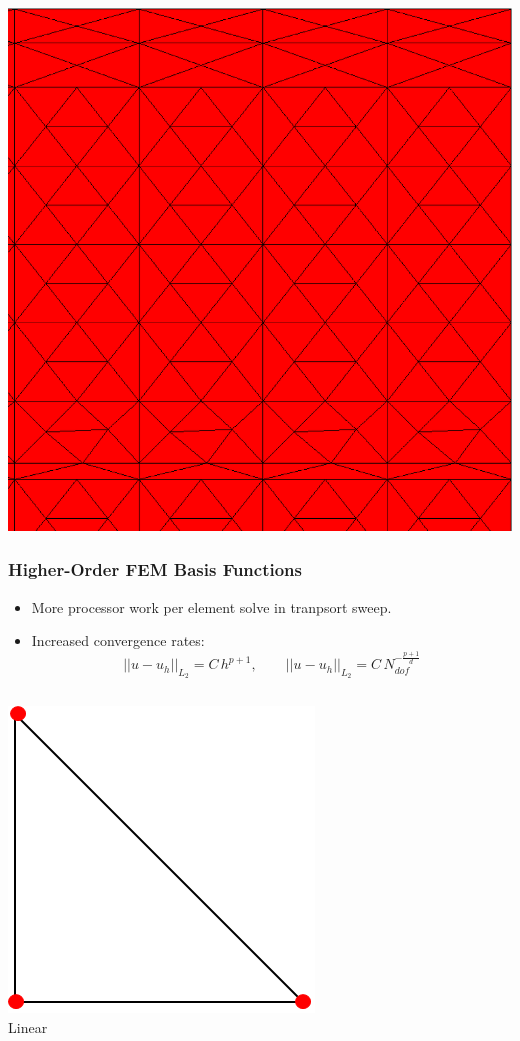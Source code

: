 \documentclass[compress,10pt]{beamer}
\begin{document}
\begin{frame}[t]
{{}\includegraphics[width=0.345\columnwidth]{images/IM1_zoom.eps}
}
\end{frame}
\begin{frame}[t]\frametitle{Higher-Order FEM Basis Functions}
\begin{block}{}
\begin{itemize}
\item <1-> More processor work per element solve in tranpsort sweep.
\item <2-> Increased convergence rates:
{
\begin{equation*}
|| u - u_h ||_{L_2} = C \, h^{p+1}, \qquad || u - u_h ||_{L_2} = C \, N_{dof}^{-\frac{p+1}{d}}
\end{equation*}
}
\end{itemize}
\end{block}
\centering
{}
{
\vspace{3mm}
\centering
\begin{columns}
\centering
{}\includegraphics[width=0.75\columnwidth]{images/ref_tri_dofs_k1.png}\\
Linear

\end{columns}}
\end{frame}
\end{document}
